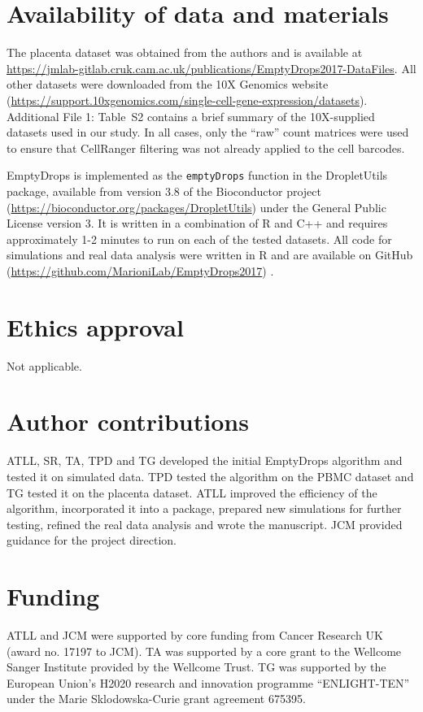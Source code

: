 \documentclass{bmcart}
\newcommand{\code}[1]{\texttt{#1}}
\newcommand{\ADD}[1]{Additional File 1: #1}
\newcommand{\supptabdataset}{S2}
\begin{document}
\section*{Availability of data and materials}
The placenta dataset was obtained from the authors \cite{vento2018single} and is available at \url{https://jmlab-gitlab.cruk.cam.ac.uk/publications/EmptyDrops2017-DataFiles}.
All other datasets were downloaded from the 10X Genomics website \cite{zheng2017massively} (\url{https://support.10xgenomics.com/single-cell-gene-expression/datasets}).
\ADD{Table~\supptabdataset{}} contains a brief summary of the 10X-supplied datasets used in our study.
In all cases, only the ``raw'' count matrices were used to ensure that CellRanger filtering was not already applied to the cell barcodes.

EmptyDrops is implemented as the \code{emptyDrops} function in the \textsf{DropletUtils} package, available from version 3.8 of the Bioconductor project (\url{https://bioconductor.org/packages/DropletUtils}) \cite{bioc2019} under the General Public License version 3.
It is written in a combination of R and C++ and requires approximately 1-2 minutes to run on each of the tested datasets.
All code for simulations and real data analysis were written in R and are available on GitHub (\url{https://github.com/MarioniLab/EmptyDrops2017}) \cite{code2019}.

\section*{Ethics approval}
Not applicable.

\section*{Author contributions}
ATLL, SR, TA, TPD and TG developed the initial EmptyDrops algorithm and tested it on simulated data.
TPD tested the algorithm on the PBMC dataset and TG tested it on the placenta dataset.
ATLL improved the efficiency of the algorithm, incorporated it into a package, prepared new simulations for further testing, refined the real data analysis and wrote the manuscript.
JCM provided guidance for the project direction. 

\section*{Funding}
ATLL and JCM were supported by core funding from Cancer Research UK (award no. 17197 to JCM).
TA was supported by a core grant to the Wellcome Sanger Institute provided by the Wellcome Trust.
TG was supported by the European Union's H2020 research and innovation programme ``ENLIGHT-TEN'' under the Marie Sklodowska-Curie grant agreement 675395.
\end{document}
